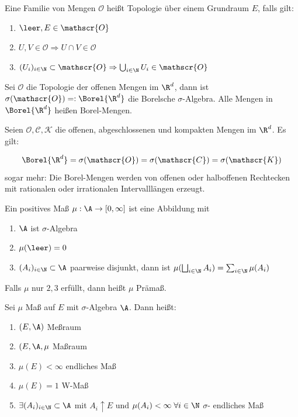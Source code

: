 \documentclass[11pt, a4paper]{article}
\def\SigAlg{$\sigma$-Algebra }
\begin{document}
\begin{definition}[Topologie]\Theorem
    Eine Familie von Mengen $\mathscr{O}$ heißt Topologie über einem Grundraum $E$, falls gilt:

    \begin{enumerate}
        \item $\leer, E \in \mathscr{O}$
        \item $U,V\in \mathscr{O}\Rightarrow U \cap V \in \mathscr{O}$
        \item $(U_i)_{i\in \N} \subset \mathscr{O} \Rightarrow \bigcup_{i\in \N} U_i \in \mathscr{O}$
    \end{enumerate}
    
\end{definition}

\begin{definition}
    Sei $\mathscr{O}$ die Topologie der offenen Mengen im $\R^d$, dann ist $\sigma(\mathscr{O}) =: \Borel{\R^d}$ die Borelsche $\sigma$-Algebra. Alle Mengen in $\Borel{\R^d}$ heißen Borel-Mengen.
\end{definition}

\begin{theorem} Seien $\mathscr{O}, \mathscr{C}, \mathscr{K}$ die offenen, abgeschlossenen und kompakten Mengen im $\R^d$. Es gilt:

$$\Borel{\R^d} = \sigma(\mathscr{O}) = \sigma(\mathscr{C}) = \sigma(\mathscr{K}) $$
sogar mehr: Die Borel-Mengen werden von offenen oder halboffenen Rechtecken mit rationalen oder irrationalen Intervalllängen erzeugt.
\end{theorem}






\begin{definition}[Maß] \Theorem
    Ein positives Maß $\mu: \A \to [0,\infty]$ ist eine Abbildung mit 
    \begin{enumerate}
        \item $\A$ ist \SigAlg
        \item $\mu(\leer) = 0$
        \item $(A_i)_{i\in\N} \subset \A$ paarweise disjunkt, dann ist $\mu(\bigsqcup_{i\in \N} A_i) = \sum_{i\in \N} \mu (A_i) $
    \end{enumerate}
Falls $\mu$ nur $2,3$ erfüllt, dann heißt $\mu$ Prämaß.
\end{definition}

\begin{definition}
    Sei $\mu$ Maß auf $E$ mit \SigAlg $\A$. Dann heißt:
    \begin{enumerate}
        \item $(E, \A)$ Meßraum
        \item $(E, \A, \mu$ Maßraum
        \item $\mu(E)<\infty$ endliches Maß
        \item $\mu(E)=1$ W-Maß
        \item $\exists (A_i)_{i\in \N} \subset \A$ mit $A_i \uparrow E$ und $\mu(A_i) < \infty \; \forall i\in \N$ $\sigma$- endliches Maß
    \end{enumerate}
\end{definition}
\end{document}
